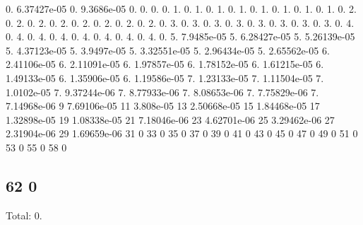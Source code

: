 0. 6.\+37427e-\/05 0. 9.\+3686e-\/05 0. 0. 0. 0. 1. 0. 1. 0. 1. 0. 1. 0. 1. 0. 1. 0. 1. 0. 1. 0. 2. 0. 2. 0. 2. 0. 2. 0. 2. 0. 2. 0. 2. 0. 2. 0. 3. 0. 3. 0. 3. 0. 3. 0. 3. 0. 3. 0. 3. 0. 3. 0. 4. 0. 4. 0. 4. 0. 4. 0. 4. 0. 4. 0. 4. 0. 4. 0. 5. 7.\+9485e-\/05 5. 6.\+28427e-\/05 5. 5.\+26139e-\/05 5. 4.\+37123e-\/05 5. 3.\+9497e-\/05 5. 3.\+32551e-\/05 5. 2.\+96434e-\/05 5. 2.\+65562e-\/05 6. 2.\+41106e-\/05 6. 2.\+11091e-\/05 6. 1.\+97857e-\/05 6. 1.\+78152e-\/05 6. 1.\+61215e-\/05 6. 1.\+49133e-\/05 6. 1.\+35906e-\/05 6. 1.\+19586e-\/05 7. 1.\+23133e-\/05 7. 1.\+11504e-\/05 7. 1.\+0102e-\/05 7. 9.\+37244e-\/06 7. 8.\+77933e-\/06 7. 8.\+08653e-\/06 7. 7.\+75829e-\/06 7. 7.\+14968e-\/06 9 7.\+69106e-\/05 11 3.\+808e-\/05 13 2.\+50668e-\/05 15 1.\+84468e-\/05 17 1.\+32898e-\/05 19 1.\+08338e-\/05 21 7.\+18046e-\/06 23 4.\+62701e-\/06 25 3.\+29462e-\/06 27 2.\+31904e-\/06 29 1.\+69659e-\/06 31 0 33 0 35 0 37 0 39 0 41 0 43 0 45 0 47 0 49 0 51 0 53 0 55 0 58 0 \subsection*{62 0 }

Total\+: 0. 